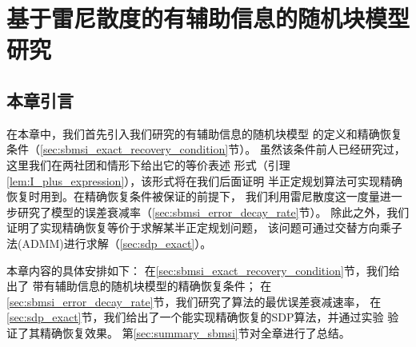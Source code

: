 \chapter{基于雷尼散度的有辅助信息的随机块模型研究}
\label{chap:sbmsi}
\section{本章引言}
在本章中，我们首先引入我们研究的有辅助信息的随机块模型
的定义和精确恢复条件（\ref{sec:sbmsi_exact_recovery_condition}节）。
虽然该条件前人已经研究过，这里我们在两社团和情形下给出它的等价表述
形式（引理\ref{lem:I_plus_expression}），该形式将在我们后面证明
半正定规划算法可实现精确恢复时用到。在精确恢复条件被保证的前提下，
我们利用雷尼散度这一度量进一步研究了模型的误差衰减率（\ref{sec:sbmsi_error_decay_rate}节）。
除此之外，我们证明了实现精确恢复等价于求解某半正定规划问题，
该问题可通过交替方向乘子法(ADMM)进行求解（\ref{sec:sdp_exact}）。

本章内容的具体安排如下：
在\ref{sec:sbmsi_exact_recovery_condition}节，我们给出了
带有辅助信息的随机块模型的精确恢复条件；
在\ref{sec:sbmsi_error_decay_rate}节，我们研究了算法的最优误差衰减速率，
在\ref{sec:sdp_exact}节，我们给出了一个能实现精确恢复的SDP算法，并通过实验
验证了其精确恢复效果。
第\ref{sec:summary_sbmsi}节对全章进行了总结。

